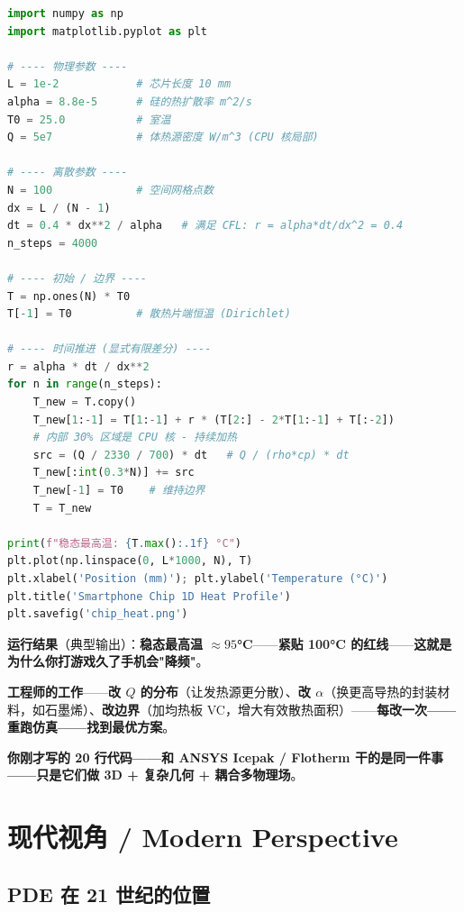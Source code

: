 \begin{lstlisting}[language=Python]
import numpy as np
import matplotlib.pyplot as plt

# ---- 物理参数 ----
L = 1e-2            # 芯片长度 10 mm
alpha = 8.8e-5      # 硅的热扩散率 m^2/s
T0 = 25.0           # 室温
Q = 5e7             # 体热源密度 W/m^3 (CPU 核局部)

# ---- 离散参数 ----
N = 100             # 空间网格点数
dx = L / (N - 1)
dt = 0.4 * dx**2 / alpha   # 满足 CFL: r = alpha*dt/dx^2 = 0.4
n_steps = 4000

# ---- 初始 / 边界 ----
T = np.ones(N) * T0
T[-1] = T0          # 散热片端恒温 (Dirichlet)

# ---- 时间推进 (显式有限差分) ----
r = alpha * dt / dx**2
for n in range(n_steps):
    T_new = T.copy()
    T_new[1:-1] = T[1:-1] + r * (T[2:] - 2*T[1:-1] + T[:-2])
    # 内部 30% 区域是 CPU 核 - 持续加热
    src = (Q / 2330 / 700) * dt   # Q / (rho*cp) * dt
    T_new[:int(0.3*N)] += src
    T_new[-1] = T0    # 维持边界
    T = T_new

print(f"稳态最高温: {T.max():.1f} °C")
plt.plot(np.linspace(0, L*1000, N), T)
plt.xlabel('Position (mm)'); plt.ylabel('Temperature (°C)')
plt.title('Smartphone Chip 1D Heat Profile')
plt.savefig('chip_heat.png')
\end{lstlisting}

\textbf{运行结果}（典型输出）：\textbf{稳态最高温 $\approx 95$°C}——\textbf{紧贴 100°C 的红线}——\textbf{这就是为什么你打游戏久了手机会"降频"}。

\textbf{工程师的工作}——\textbf{改 $Q$ 的分布}（让发热源更分散）、\textbf{改 $\alpha$}（换更高导热的封装材料，如石墨烯）、\textbf{改边界}（加均热板 VC，增大有效散热面积）——\textbf{每改一次——重跑仿真——找到最优方案}。

\textbf{你刚才写的 20 行代码——和 ANSYS Icepak / Flotherm 干的是同一件事——只是它们做 3D + 复杂几何 + 耦合多物理场}。

\section{现代视角 / Modern Perspective}

\subsection{PDE 在 21 世纪的位置}

